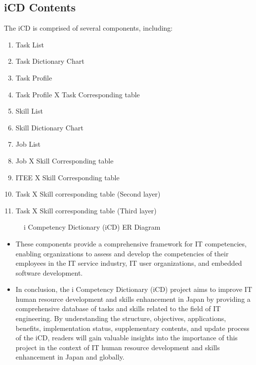 \subsection{iCD Contents}
The iCD is comprised of several components, including:

\begin{enumerate}
    \item Task List
    \item Task Dictionary Chart
    \item Task Profile
    \item Task Profile X Task Corresponding table
    \item Skill List
    \item Skill Dictionary Chart
    \item Job List
    \item Job X Skill Corresponding table
    \item ITEE X Skill Corresponding table
    \item Task X Skill corresponding table (Second layer)
    \item Task X Skill corresponding table (Third layer)
\end{enumerate}

\begin{figure}[H]
    \centering
    \caption{ i Competency Dictionary (iCD) ER Diagram }
    \label{fig:iCD_ER_Diagram}
\end{figure}

\begin{itemize}
    \renewcommand\labelitemi{-}
    \item These components provide a comprehensive framework for IT competencies, enabling organizations to assess and develop the competencies of their employees in the IT service industry, IT user organizations, and embedded software development.
    \item In conclusion, the i Competency Dictionary (iCD) project aims to improve IT human resource development and skills enhancement in Japan by providing a comprehensive database of tasks and skills related to the field of IT engineering. By understanding the structure, objectives, applications, benefits, implementation status, supplementary contents, and update process of the iCD, readers will gain valuable insights into the importance of this project in the context of IT human resource development and skills enhancement in Japan and globally.
\end{itemize}

